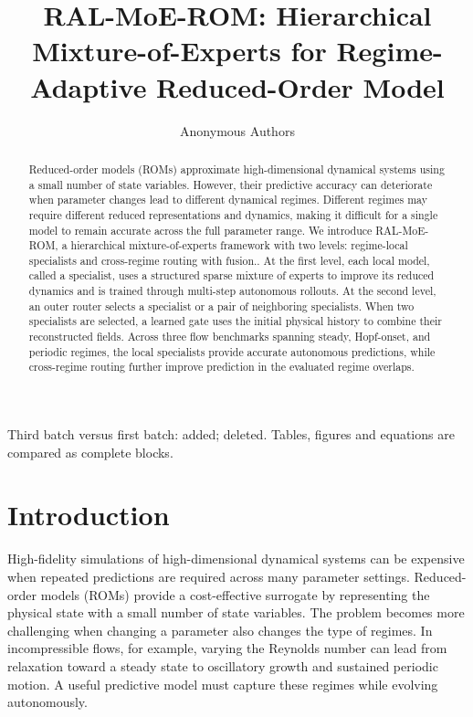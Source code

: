 \documentclass{article}
\title{RAL-MoE-ROM: Hierarchical Mixture-of-Experts for Regime-Adaptive Reduced-Order Model }
\author{Anonymous Authors}
\begin{document}
\raggedbottom

\maketitle
\begin{center}\small Third batch versus first batch: {\color{blue}added}; {\color{red}deleted}. Tables, figures and equations are compared as complete blocks.\end{center}

\begin{abstract}
Reduced-order models (ROMs) approximate high-dimensional dynamical systems using a small number of state variables. However, their predictive accuracy can deteriorate when parameter changes lead to different dynamical regimes. Different regimes may require different reduced representations and dynamics, making it difficult for a single model to remain accurate across the full parameter range. We introduce RAL-MoE-ROM, a hierarchical mixture-of-experts framework with two levels: regime-local specialists and cross-regime routing with fusion.. At the first level, each local model, called a specialist, uses a structured sparse mixture of experts to improve its reduced dynamics and is trained through multi-step autonomous rollouts. At the second level, an outer router selects a specialist or a pair of neighboring specialists. When two specialists are selected, a learned gate uses the initial physical history to combine their reconstructed fields. Across three flow benchmarks spanning steady, Hopf-onset, and periodic regimes, the local specialists provide accurate autonomous predictions, while cross-regime routing further improve prediction in the evaluated regime overlaps.
\end{abstract}

\section{Introduction}

High-fidelity simulations of high-dimensional dynamical systems
can be expensive when repeated predictions are required across many parameter settings. Reduced-order models (ROMs) provide a cost-effective surrogate by representing the physical state with a small number of state variables. The problem becomes more challenging when changing a parameter also changes the type of regimes. In incompressible flows, for example, varying the Reynolds number can lead from relaxation toward a steady state to oscillatory growth and sustained periodic motion. A useful predictive model must capture these regimes while evolving autonomously.
\end{document}
